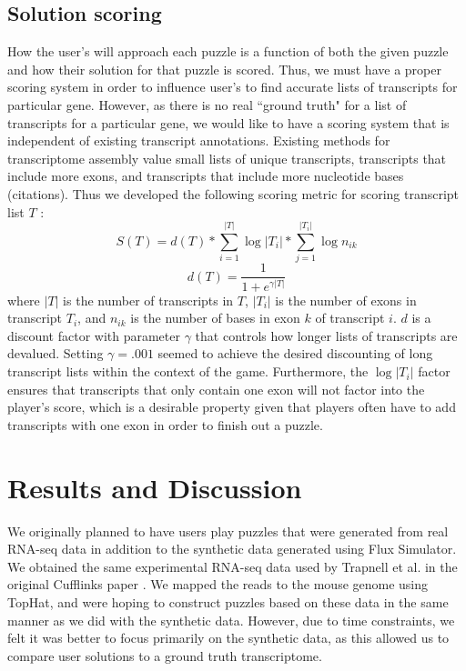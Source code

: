 \documentclass[12pt]{article}
\begin{document}
\subsection*{Solution scoring}
How the user's will approach each puzzle is a function of both the given puzzle and how their solution for that puzzle is scored. Thus, we must have
a proper scoring system in order to influence user's to find accurate lists of transcripts for particular gene. However, as there is no real ``ground truth"
for a list of transcripts for a particular gene, we would like to have a scoring system that is independent of existing transcript annotations. Existing methods
for transcriptome assembly value small lists of unique transcripts, transcripts that include more exons, and transcripts that include more nucleotide bases (citations).
Thus we developed the following scoring metric for scoring transcript list $T$ :
\begin{equation*}
S(T) = d(T) * \sum_{i=1}^{|T|} \log{|T_i|} * \sum_{j = 1}^{|T_i|} \log{n_{ik}}
\end{equation*}
\begin{equation*}
d(T) = \frac{1}{1+e^{\gamma |T|}}
\end{equation*}
where $|T|$ is the number of transcripts in $T$, $|T_i|$ is the number of exons in transcript $T_i$, and $n_{ik}$ is the number of bases in exon $k$ of transcript $i$.
$d$ is a discount factor with parameter $\gamma$ that controls how longer lists of transcripts are devalued. Setting $\gamma = .001$ seemed to achieve the desired
discounting of long transcript lists within the context of the game. Furthermore, the $\log{|T_i|}$ factor ensures that transcripts that only contain one exon will not factor
into the player's score, which is a desirable property given that players often have to add transcripts with one exon in order to finish out a puzzle.

\section*{Results and Discussion}

We originally planned to have users play puzzles that were generated from real RNA-seq data in addition to the synthetic data generated using Flux Simulator.
We obtained the same experimental RNA-seq data used by Trapnell et al. in the original Cufflinks paper \citep{trapnell2010transcript}. We mapped the reads to 
the mouse genome using TopHat, and were hoping to construct puzzles based on these data in the same manner as we did with the synthetic data. However, due
to time constraints, we felt it was better to focus primarily on the synthetic data, as this allowed us to compare user solutions to a ground truth transcriptome.
\end{document}
